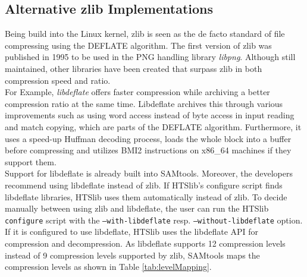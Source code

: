 \subsection{Alternative zlib Implementations}
Being build into the Linux kernel, zlib is seen as the de facto standard of file compressing using the DEFLATE algorithm. The first version of zlib was published in 1995 to be used in the PNG handling library \textit{libpng}. Although still maintained, other libraries have been created that surpass zlib in both compression speed and ratio.\\
For Example, \textit{libdeflate} \cite{biggers_ebiggerslibdeflate_2024} offers faster compression while archiving a better compression ratio at the same time. Libdeflate archives this through various improvements such as using word access instead of byte access in input reading and match copying, which are parts of the DEFLATE algorithm. Furthermore, it uses a speed-up Huffman decoding process, loads the whole block into a buffer before compressing and utilizes BMI2 instructions on x86\_64 machines if they support them. \\ %
Support for libdeflate is already built into SAMtools. Moreover, the developers recommend using libdeflate instead of zlib. If HTSlib's configure script finds libdeflate libraries, HTSlib uses them automatically instead of zlib. To decide manually between using zlib and libdeflate, the user can run the HTSlib \texttt{configure} script with the \texttt{--with-libdeflate} resp. \texttt{--without-libdeflate} option. If it is configured to use libdeflate, HTSlib uses the libdeflate API for compression and decompression. As libdeflate supports 12 compression levels instead of 9 compression levels supported by zlib, SAMtools maps the compression levels as shown in Table \ref{tab:levelMapping}. \\
